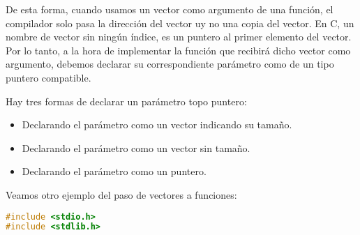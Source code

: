 {\begin{Ejemplo}
De esta forma, cuando usamos un vector como argumento de una función, el compilador solo pasa la dirección del vector uy no una copia del vector. En C, un nombre de vector sin ningún índice, es un puntero al primer elemento del vector. Por lo tanto, a la hora de implementar la función que recibirá dicho vector como argumento, debemos declarar su correspondiente parámetro como de un tipo puntero compatible.\\
\end{Ejemplo}

Hay tres formas de declarar un parámetro topo puntero:
\begin{itemize}
	\item Declarando el parámetro como un vector indicando su tamaño.
	\item Declarando el parámetro como un vector sin tamaño.
	\item Declarando el parámetro como un puntero.
\end{itemize}
Veamos otro ejemplo del paso de vectores a funciones:
\begin{Ejemplo}
\begin{lstlisting}[language=C]
#include <stdio.h>
#include <stdlib.h>


\end{lstlisting}
\end{Ejemplo}}
